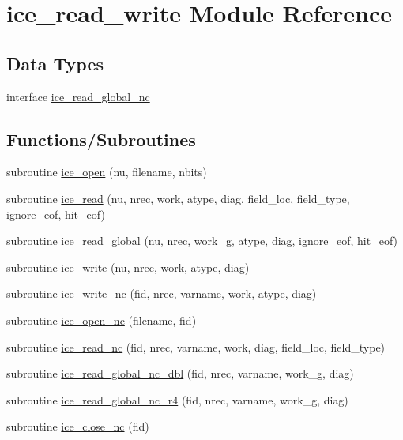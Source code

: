 \hypertarget{namespaceice__read__write}{
\section{ice\_\-read\_\-write Module Reference}
\label{namespaceice__read__write}
}
\subsection*{Data Types}
\begin{DoxyCompactItemize}
\item 
interface \hyperlink{interfaceice__read__write_1_1ice__read__global__nc}{ice\_\-read\_\-global\_\-nc}
\end{DoxyCompactItemize}
\subsection*{Functions/Subroutines}
\begin{DoxyCompactItemize}
\item 
subroutine \hyperlink{namespaceice__read__write_ad696392c65cb5608c5d752fd21772c6c}{ice\_\-open} (nu, filename, nbits)
\item 
subroutine \hyperlink{namespaceice__read__write_a0a5831674445b8a414a0b73b554ad166}{ice\_\-read} (nu, nrec, work, atype, diag, field\_\-loc, field\_\-type, ignore\_\-eof, hit\_\-eof)
\item 
subroutine \hyperlink{namespaceice__read__write_a25d913eb64dad37cf58e9c095ad4627a}{ice\_\-read\_\-global} (nu, nrec, work\_\-g, atype, diag, ignore\_\-eof, hit\_\-eof)
\item 
subroutine \hyperlink{namespaceice__read__write_a6fd5225cadcb9e4b36318dc93d4d8201}{ice\_\-write} (nu, nrec, work, atype, diag)
\item 
subroutine \hyperlink{namespaceice__read__write_a371e7c35fea2456c221e0451f87bb2eb}{ice\_\-write\_\-nc} (fid, nrec, varname, work, atype, diag)
\item 
subroutine \hyperlink{namespaceice__read__write_ab2f5aad237f6bdcee1e5e90537050822}{ice\_\-open\_\-nc} (filename, fid)
\item 
subroutine \hyperlink{namespaceice__read__write_a412c3f66b66a3ff61e7b5c3fb3205889}{ice\_\-read\_\-nc} (fid, nrec, varname, work, diag, field\_\-loc, field\_\-type)
\item 
subroutine \hyperlink{namespaceice__read__write_a7e7f4faac57a154facfd07a272b2cb76}{ice\_\-read\_\-global\_\-nc\_\-dbl} (fid, nrec, varname, work\_\-g, diag)
\item 
subroutine \hyperlink{namespaceice__read__write_a3fda8cf973518b47282724d7464eddc5}{ice\_\-read\_\-global\_\-nc\_\-r4} (fid, nrec, varname, work\_\-g, diag)
\item 
subroutine \hyperlink{namespaceice__read__write_ae296957254d38ce1229d08bd1ded45a6}{ice\_\-close\_\-nc} (fid)
\end{DoxyCompactItemize}


